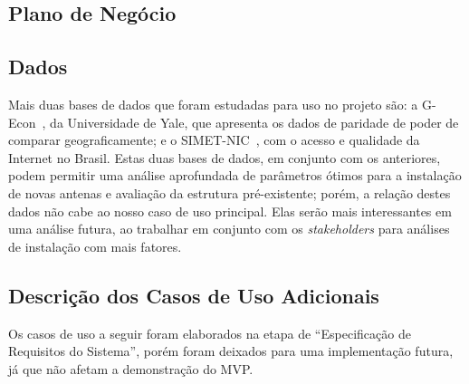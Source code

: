 \documentclass[]{politex}
\begin{document}
\subsection{Plano de Negócio}


\subsection{Dados}

Mais duas bases de dados que foram estudadas para uso no projeto são: a G-Econ~\cite{gecon},
da Universidade de Yale, que apresenta os dados de paridade de
poder de comparar geograficamente; e o SIMET-NIC~\cite{simet}, com o acesso e
qualidade da Internet no Brasil. Estas duas bases de dados, em conjunto com os
anteriores, podem permitir uma análise aprofundada de parâmetros ótimos para a
instalação de novas antenas e avaliação da estrutura pré-existente; porém,
a relação destes dados não cabe ao nosso caso de uso principal. Elas serão mais
interessantes em uma análise futura, ao trabalhar em conjunto com os
\textit{stakeholders} para análises de instalação com mais fatores.

\subsection{Descrição dos Casos de Uso Adicionais}

Os casos de uso a seguir foram elaborados na etapa de ``Especificação de
Requisitos do Sistema'', porém foram deixados para uma implementação futura, já
que não afetam a demonstração do MVP.
\end{document}
